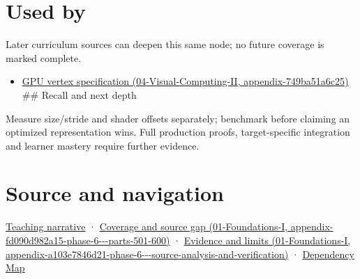 \section{Used by}\label{appendix-26bf6bf2fb8b-used-by}

Later curriculum sources can deepen this same node; no future coverage is marked complete.

\begin{itemize}
\tightlist
\item
  \href{../04-Visual-Computing-II/main.pdf\#nameddest=appendix-749ba51a6c25}{GPU vertex specification (04-Visual-Computing-II, appendix-749ba51a6c25)} \#\# Recall and next depth
\end{itemize}

Measure size/stride and shader offsets separately; benchmark before claiming an optimized representation wins. Full production proofs, target-specific integration and learner mastery require further evidence.

\section{Source and navigation}\label{appendix-26bf6bf2fb8b-source-and-navigation}

\href{Continuous\%20Notes/Computing\%20Foundations\%20-\%20From\%20Bits\%20to\%20C++\%20and\%20Systems\%20APIs\#Storage\%20and\%20computation\%20can\%20choose\%20different\%20layouts}{Teaching narrative} · \href{../01-Foundations-I/main.pdf\#nameddest=appendix-fd090d982a15-phase-6---parts-501-600}{Coverage and source gap (01-Foundations-I, appendix-fd090d982a15-phase-6-\/-\/-parts-501-600)} · \href{../01-Foundations-I/main.pdf\#nameddest=appendix-a103e7846d21-phase-6---source-analysis-and-verification}{Evidence and limits (01-Foundations-I, appendix-a103e7846d21-phase-6-\/-\/-source-analysis-and-verification)} · \hyperref[appendix-4ad47bdd269a]{Dependency Map}
